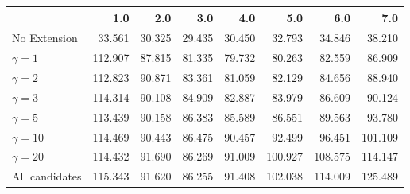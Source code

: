 \begin{tabular}{lrrrrrrr}
\toprule
{} &     1.0 &    2.0 &    3.0 &    4.0 &     5.0 &     6.0 &     7.0 \\
\midrule
No Extension   &  33.561 & 30.325 & 29.435 & 30.450 &  32.793 &  34.846 &  38.210 \\
$\gamma = 1$   & 112.907 & 87.815 & 81.335 & 79.732 &  80.263 &  82.559 &  86.909 \\
$\gamma = 2$   & 112.823 & 90.871 & 83.361 & 81.059 &  82.129 &  84.656 &  88.940 \\
$\gamma = 3$   & 114.314 & 90.108 & 84.909 & 82.887 &  83.979 &  86.609 &  90.124 \\
$\gamma = 5$   & 113.439 & 90.158 & 86.383 & 85.589 &  86.551 &  89.563 &  93.780 \\
$\gamma = 10$  & 114.469 & 90.443 & 86.475 & 90.457 &  92.499 &  96.451 & 101.109 \\
$\gamma = 20$  & 114.432 & 91.690 & 86.269 & 91.009 & 100.927 & 108.575 & 114.147 \\
All candidates & 115.343 & 91.620 & 86.255 & 91.408 & 102.038 & 114.009 & 125.489 \\
\bottomrule
\end{tabular}
